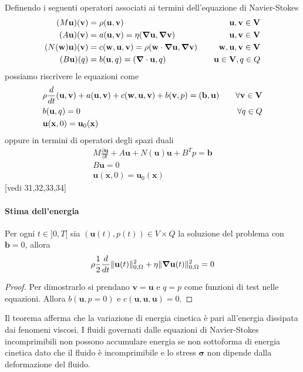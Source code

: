 Definendo i seguenti operatori associati ai termini dell'equazione di Navier-Stokes
\begin{equation}
\begin{aligned}
(M\mathbf{u})(\mathbf{v})&=\rho\ps{\mathbf{u}}{\mathbf{v}} \quad &\mathbf{u},\mathbf{v}\in \mathbf{V}\\
(A\mathbf{u})(\mathbf{v})&=a(\mathbf{u},\mathbf{v})=\eta\ps{\Nabla\mathbf{u}}{\Nabla\mathbf{v}} \quad &\mathbf{u},\mathbf{v}\in \mathbf{V}\\
(N(\mathbf{w})\mathbf{u})(\mathbf{v})&=c(\mathbf{w},\mathbf{u},\mathbf{v})=\rho\ps{\mathbf{w}\cdot\Nabla\mathbf{u}}{\Nabla\mathbf{v}} \quad &\mathbf{w},\mathbf{u},\mathbf{v}\in \mathbf{V}\\
(B\mathbf{u})(q)&=b(\mathbf{u},q)=\ps{\Nabla\cdot\mathbf{u}}{q} \quad &\mathbf{u}\in \mathbf{V},q\in Q
\end{aligned}
\end{equation}
possiamo riscrivere le equazioni come
\begin{equation}
\begin{aligned}
&\rho\frac{d}{dt}\ps{\mathbf{u}}{\mathbf{v}}+a(\mathbf{u},\mathbf{v})+c(\mathbf{w},\mathbf{u},\mathbf{v})+b(\mathbf{v},p)=\ps{\mathbf{b}}{\mathbf{u}} \quad &\forall\mathbf{v}\in\mathbf{V}\\
&b(\mathbf{u},q)=0 \quad &\forall q\in Q\\
&\mathbf{u}(\mathbf{x},0)=\mathbf{u}_0(\mathbf{x})&
\end{aligned}
\end{equation}
oppure in termini di operatori degli spazi duali
\begin{equation}
\begin{aligned}
&M\frac{\partial\mathbf{u}}{\partial t}+A\mathbf{u}+N(\mathbf{u})\mathbf{u}+B^{T}p=\mathbf{b}\\
&B\mathbf{u}=0\\
&\mathbf{u}(\mathbf{x},0)=\mathbf{u}_0(\mathbf{x})&
\end{aligned}
\end{equation}
[vedi 31,32,33,34]

\paragraph{Stima dell'energia}
\begin{theorem}
Per ogni $t \in ]0,T[$ sia $(\mathbf{u}(t),p(t)) \in V \times Q$ la soluzione del problema con $\mathbf{b}=0$, allora
$$\rho \frac{1}{2} \frac{d}{dt} \Vert \mathbf{u} (t) \Vert^2_{0,\Omega} + \eta \Vert \boldsymbol{\nabla} \mathbf{u} (t) \Vert^2_{0,\Omega} = 0$$
\end{theorem}
\begin{proof}
Per dimostrarlo si prendano $\mathbf{v}=\mathbf{u}$ e $q=p$ come funzioni di test nelle equazioni. Allora $b(\mathbf{u},p=0)$ e $c(\mathbf{u},\mathbf{u},\mathbf{u})=0$.
\end{proof}
Il teorema afferma che la variazione di energia cinetica è pari all'energia dissipata dai fenomeni viscosi.
I fluidi governati dalle equazioni di Navier-Stokes incomprimibili non possono accumulare energia se non sottoforma di energia cinetica dato che il fluido è incomprimibile e lo stress $\boldsymbol{\sigma}$ non dipende dalla deformazione del fluido. 

